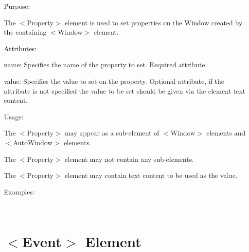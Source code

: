 \begin{DoxyItemize}
\item Purpose\+:
\begin{DoxyItemize}
\item The $<$Property$>$ element is used to set properties on the Window created by the containing $<$Window$>$ element.
\end{DoxyItemize}
\item Attributes\+:
\begin{DoxyItemize}
\item {\ttfamily name\+:} Specifies the name of the property to set. Required attribute.
\item {\ttfamily value\+:} Specifies the value to set on the property. Optional attribute, if the attribute is not specified the value to be set should be given via the element text content.
\end{DoxyItemize}
\item Usage\+:
\begin{DoxyItemize}
\item The $<$Property$>$ may appear as a sub-\/element of $<$Window$>$ elements and $<$Auto\+Window$>$ elements.
\item The $<$Property$>$ element may not contain any sub-\/elements.
\item The $<$Property$>$ element may contain text content to be used as the value.
\end{DoxyItemize}
\item Examples\+:
\end{DoxyItemize}

~\newline
 \hypertarget{xml_layout_xml_layout_event}{}\section{$<$\+Event$>$ Element}\label{xml_layout_xml_layout_event}

